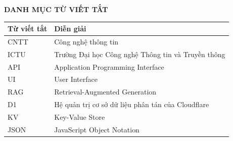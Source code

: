 \vspace*{15pt}
\begin{center}
\large{\textbf{DANH MỤC TỪ VIẾT TẮT}}
\end{center}


\begin{table}[H]
\centering
\renewcommand{\arraystretch}{1.3}
\begin{tabular}{|p{4cm}|p{9cm}|}
\hline
\textbf{Từ viết tắt} & \textbf{Diễn giải} \\
\hline
CNTT & Công nghệ thông tin \\
\hline
ICTU & Trường Đại học Công nghệ Thông tin và Truyền thông \\
\hline
API & Application Programming Interface \\
\hline
UI & User Interface \\
\hline
RAG & Retrieval-Augmented Generation \\
\hline
D1 & Hệ quản trị cơ sở dữ liệu phân tán của Cloudflare \\
\hline
KV & Key-Value Store \\
\hline
JSON & JavaScript Object Notation \\
\hline
\end{tabular}
\end{table}
